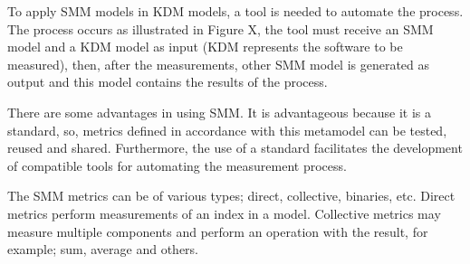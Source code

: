 To apply SMM models in KDM models, a tool is needed to automate the process. The process occurs as illustrated in Figure X, the tool must receive an SMM model and a KDM model as input (KDM represents the software to be measured), then, after the measurements, other SMM model is generated as output and this model contains the results of the process.

There are some advantages in using SMM. It is advantageous because it is a standard, so, metrics defined in accordance with this metamodel can be tested, reused and shared. Furthermore, the use of a standard facilitates the development of compatible tools for automating the measurement process.

The SMM metrics can be of various types; direct, collective, binaries, etc. Direct metrics perform measurements of an index in a model. Collective metrics may measure multiple components and perform an operation with the result, for example; sum, average and others.
